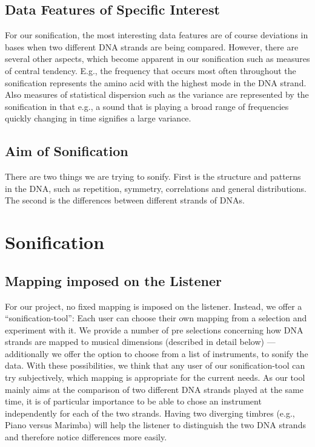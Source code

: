\documentclass[10pt]{article}
\begin{document}
\subsection{Data Features of Specific Interest}
For our sonification, the most interesting data features are of course deviations in 
bases when two different DNA strands are being compared. However, there are several other 
aspects, which become apparent in our sonification such as measures of central tendency. 
E.g., the frequency that occurs most often throughout the sonification represents the amino acid with the highest mode in the DNA strand. Also measures of statistical dispersion such as 
the variance are represented by the sonification in that e.g., a sound that is playing a broad 
range of frequencies quickly changing in time signifies a large variance.
\subsection{Aim of Sonification}
There are two things we are trying to sonify. First is the structure and patterns in the 
DNA, such as repetition, symmetry, correlations and general distributions. The second is the 
differences between different strands of DNAs. 

\section{Sonification}
\subsection{Mapping imposed on the Listener}
For our project, no fixed mapping is imposed on the listener. Instead, we offer a 
“sonification-tool”: Each user can choose their own mapping from a selection and experiment 
with it. We provide a number of pre selections concerning how DNA strands are mapped to 
musical dimensions (described in detail below) — additionally we offer the option to choose 
from a list of instruments, to sonify the data. With these possibilities, we think that any user 
of our sonification-tool can try subjectively, which mapping is appropriate for the current 
needs. As our tool mainly aims at the comparison of two different DNA strands played at the 
same time, it is of particular importance to be able to chose an instrument independently for 
each of the two strands. Having two diverging timbres (e.g., Piano versus Marimba) will help 
the listener to distinguish the two DNA strands and therefore notice differences more easily.
\end{document}
